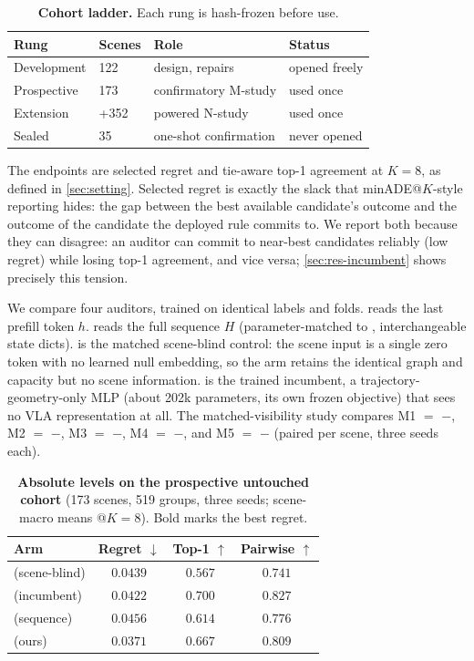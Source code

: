 \begin{table}[t]
  \centering
  \small
  \setlength{\tabcolsep}{4pt}
  \begin{tabular}{@{}llll@{}}
    \toprule
    Rung & Scenes & Role & Status \\
    \midrule
    Development & 122 & design, repairs & opened freely \\
    Prospective & 173 & confirmatory M-study & used once \\
    Extension & +352 & powered N-study & used once \\
    Sealed & 35 & one-shot confirmation & never opened \\
    \bottomrule
  \end{tabular}
  \caption{\textbf{Cohort ladder.} Each rung is hash-frozen before use.}
  \label{tab:ladder}
\end{table}

The endpoints are selected regret and tie-aware top-1 agreement at $K{=}8$, as defined in \cref{sec:setting}.
Selected regret is exactly the slack that minADE@$K$-style reporting hides: the gap between the best available candidate's outcome and the outcome of the candidate the deployed rule commits to.
We report both because they can disagree: an auditor can commit to near-best candidates reliably (low regret) while losing top-1 agreement, and vice versa; \cref{sec:res-incumbent} shows precisely this tension.

We compare four auditors, trained on identical labels and folds.
\Ltok{} reads the last prefill token $h$.
\Lfull{} reads the full sequence $H$ (parameter-matched to \Ltok{}, interchangeable state dicts).
\Lnull{} is the matched scene-blind control: the scene input is a single zero token with no learned null embedding, so the arm retains the identical graph and capacity but no scene information.
\Lgeo{} is the trained incumbent, a trajectory-geometry-only MLP (about 202k parameters, its own frozen objective) that sees no VLA representation at all.
The matched-visibility study compares
M1 $=$ \Lfull$-$\Ltok,
M2 $=$ \Lfull$-$\Lnull,
M3 $=$ \Ltok$-$\Lnull,
M4 $=$ \Lfull$-$\Lgeo, and
M5 $=$ \Ltok$-$\Lgeo{}
(paired per scene, three seeds each).

\begin{table}[t]
  \centering
  \small
  \begin{tabular}{@{}lccc@{}}
    \toprule
    Arm & Regret $\downarrow$ & Top-1 $\uparrow$ & Pairwise $\uparrow$ \\
    \midrule
    \Lnull{} (scene-blind) & $0.0439$ & $0.567$ & $0.741$ \\
    \Lgeo{} (incumbent) & $0.0422$ & $0.700$ & $0.827$ \\
    \Lfull{} (sequence) & $0.0456$ & $0.614$ & $0.776$ \\
    \Ltok{} (ours) & $\mathbf{0.0371}$ & $0.667$ & $0.809$ \\
    \bottomrule
  \end{tabular}
  \caption{\textbf{Absolute levels on the prospective untouched cohort} (173 scenes, 519 groups, three seeds; scene-macro means @$K{=}8$). Bold marks the best regret.}
  \label{tab:main-abs}
\end{table}

